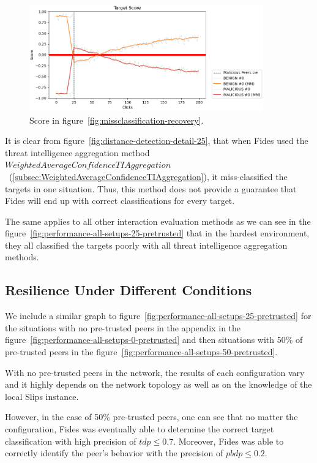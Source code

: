 \begin{figure}[ht]
    \centering
    \includegraphics[width=0.9\textwidth]{assets/misclassification_score.png}
    \caption{Score in figure~\ref{fig:missclassification-recovery}.}
    \label{fig:missclassification-score-only}
\end{figure}

It is clear from figure~\ref{fig:distance-detection-detail-25}, that when Fides used the threat intelligence aggregation method  $WeightedAverageConfidenceTIAggregation$~(\ref{subsec:WeightedAverageConfidenceTIAggregation}), it miss-classified the targets in one situation.
Thus, this method does not provide a guarantee that Fides will end up with correct classifications for every target.

The same applies to all other interaction evaluation methods as we can see in the figure~\ref{fig:performance-all-setups-25-pretrusted} that in the hardest environment, they all classified the targets poorly with all threat intelligence aggregation methods.

\subsection{Resilience Under Different Conditions}
\label{subsec:resilience-under-different-conditions}

We include a similar graph to figure~\ref{fig:performance-all-setups-25-pretrusted} for the situations with no pre-trusted peers in the appendix in the figure~\ref{fig:performance-all-setups-0-pretrusted} and then situations with 50\% of pre-trusted peers in the figure~\ref{fig:performance-all-setups-50-pretrusted}.

With no pre-trusted peers in the network, the results of each configuration vary and it highly depends on the network topology as well as on the knowledge of the local Slips instance.

However, in the case of 50\% pre-trusted peers, one can see that no matter the configuration, Fides was eventually able to determine the correct target classification with high precision of $tdp \leq 0.7$. Moreover, Fides was able to correctly identify the peer's behavior with the precision of $pbdp \leq 0.2$.